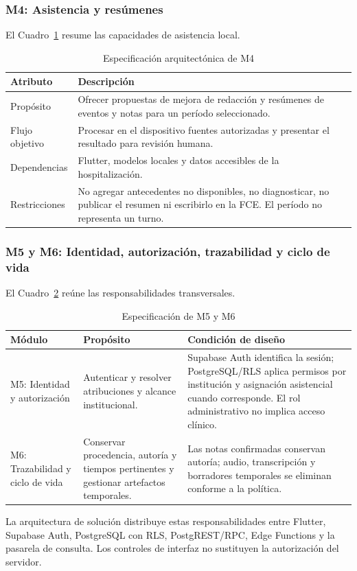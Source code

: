 \subsubsection*{M4: Asistencia y resúmenes}

El Cuadro~\ref{tab:modulo_m4} resume las capacidades de asistencia local.

\begin{table}[H]
    \caption{Especificación arquitectónica de M4}
    \label{tab:modulo_m4}
    \begin{tabularx}{\textwidth}{|l|X|}
        \hline
        \textbf{Atributo} & \textbf{Descripción} \\
        \hline
        Propósito & Ofrecer propuestas de mejora de redacción y resúmenes de eventos y notas para un período seleccionado. \\
        \hline
        Flujo objetivo & Procesar en el dispositivo fuentes autorizadas y presentar el resultado para revisión humana. \\
        \hline
        Dependencias & Flutter, modelos locales y datos accesibles de la hospitalización. \\
        \hline
        Restricciones & No agregar antecedentes no disponibles, no diagnosticar, no publicar el resumen ni escribirlo en la FCE. El período no representa un turno. \\
        \hline
    \end{tabularx}
\end{table}

\subsubsection*{M5 y M6: Identidad, autorización, trazabilidad y ciclo de vida}

El Cuadro~\ref{tab:modulos_m5_m6} reúne las responsabilidades transversales.

\begin{table}[H]
    \caption{Especificación de M5 y M6}
    \label{tab:modulos_m5_m6}
    \begin{tabularx}{\textwidth}{|l|X|X|}
        \hline
        \textbf{Módulo} & \textbf{Propósito} & \textbf{Condición de diseño} \\
        \hline
        M5: Identidad y autorización & Autenticar y resolver atribuciones y alcance institucional. & Supabase Auth identifica la sesión; PostgreSQL/RLS aplica permisos por institución y asignación asistencial cuando corresponde. El rol administrativo no implica acceso clínico. \\
        \hline
        M6: Trazabilidad y ciclo de vida & Conservar procedencia, autoría y tiempos pertinentes y gestionar artefactos temporales. & Las notas confirmadas conservan autoría; audio, transcripción y borradores temporales se eliminan conforme a la política. \\
        \hline
    \end{tabularx}
\end{table}

La arquitectura de solución distribuye estas responsabilidades entre Flutter, Supabase Auth, PostgreSQL con RLS, PostgREST/RPC, Edge Functions y la pasarela de consulta. Los controles de interfaz no sustituyen la autorización del servidor.
